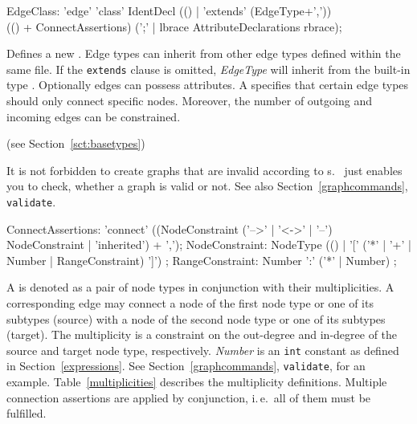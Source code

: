 \begin{rail}    
  EdgeClass: 'edge' 'class' IdentDecl (() | 'extends' (EdgeType+',')) \\
    (() + ConnectAssertions) (';' | lbrace AttributeDeclarations rbrace);
\end{rail}
Defines a new . Edge types can inherit from other edge types defined within the same file. If the \texttt{extends} clause is omitted, \emph{EdgeType} will inherit from the built-in type \texttt{}. Optionally edges can possess attributes. A  specifies that certain edge types should only connect specific nodes. Moreover, the number of outgoing and incoming edges can be constrained.

(see Section~\ref{sct:basetypes})

\begin{note}
It is not forbidden to create graphs that are invalid according to s. \GrG\ just enables you to check, whether a graph is valid or not. See also Section~\ref{graphcommands}, \texttt{validate}.
\end{note}

\begin{rail}  
  ConnectAssertions: 'connect' ((NodeConstraint ('-->' | '<->' | '--') NodeConstraint | 'inherited') + ',');
  NodeConstraint: NodeType (() | '[' ('*' | '+' | Number | RangeConstraint) ']') ;
  RangeConstraint: Number ':' ('*' | Number) ;
\end{rail}
A \emph{} is denoted as a pair of node types in conjunction with their multiplicities. 
A corresponding edge may connect a node of the first node type or one of its subtypes (source) with a node of the second node type or one of its subtypes (target). 
The multiplicity is a constraint on the out-degree and in-degree of the source and target node type, respectively. 
\emph{Number} is an \texttt{int} constant as defined in Section~\ref{expressions}. 
See Section~\ref{graphcommands}, \texttt{validate}, for an example. 
Table~\ref{multiplicities} describes the multiplicity definitions. 
Multiple connection assertions are applied by conjunction, i.\,e.\ all of them must be fulfilled.

